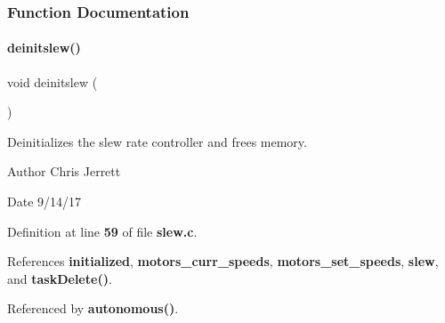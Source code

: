 \subsubsection{Function Documentation}
\mbox{\label{slew_8c_a981c9990a969d2587e66e550737f7cd9}} 
\paragraph{deinitslew()}
{\footnotesize\ttfamily void deinitslew (\begin{DoxyParamCaption}{ }\end{DoxyParamCaption})}



Deinitializes the slew rate controller and frees memory. 

\begin{DoxyAuthor}{Author}
Chris Jerrett 
\end{DoxyAuthor}
\begin{DoxyDate}{Date}
9/14/17 
\end{DoxyDate}


Definition at line \textbf{ 59} of file \textbf{ slew.\+c}.



References \textbf{ initialized}, \textbf{ motors\+\_\+curr\+\_\+speeds}, \textbf{ motors\+\_\+set\+\_\+speeds}, \textbf{ slew}, and \textbf{ task\+Delete()}.



Referenced by \textbf{ autonomous()}.


